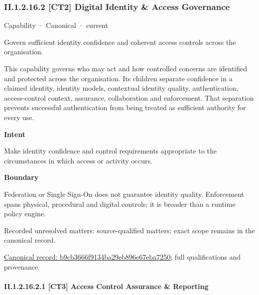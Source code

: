 \subsubsection*{II.1.2.16.2 [CT2] Digital Identity \& Access Governance}
\label{navigation:II.1.2.16.2}

\label{element:b9cb3666f9134ba29eb896e67eba7250}
{\small Capability · Canonical · current}\par

Govern sufficient identity confidence and coherent access controls across the organisation.



This capability governs who may act and how controlled concerns are identified and protected across the organisation. Its children separate confidence in a claimed identity, identity models, contextual identity quality, authentication, access-control context, assurance, collaboration and enforcement. That separation prevents successful authentication from being treated as sufficient authority for every use.



\textbf{Intent}



Make identity confidence and control requirements appropriate to the circumstances in which access or activity occurs.



\textbf{Boundary}



Federation or Single Sign-On does not guarantee identity quality. Enforcement spans physical, procedural and digital controls; it is broader than a runtime policy engine.


{\small Recorded unresolved matters: source-qualified matters; exact scope remains in the canonical record.}\par
{\footnotesize \href{../../../../continuum/strategy/capability/b9cb3666f9134ba29eb896e67eba7250.md}{Canonical record: b9cb3666f9134ba29eb896e67eba7250}; full qualifications and provenance.}\par
\paragraph*{II.1.2.16.2.1 [CT3] Access Control Assurance \& Reporting}
\label{navigation:II.1.2.16.2.1}

